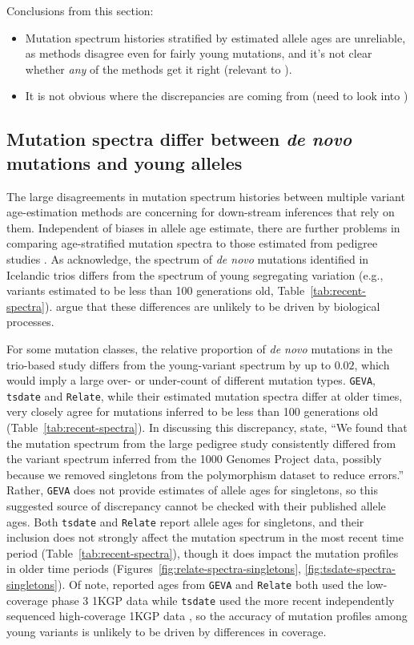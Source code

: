 \documentclass[]{article}
\newcommand{\GEVA}{\texttt{GEVA}\xspace}
\newcommand{\tsdate}{\texttt{tsdate}\xspace}
\newcommand{\relate}{\texttt{Relate}\xspace}
\begin{document}
Conclusions from this section:
\begin{itemize}
    \item Mutation spectrum histories stratified by estimated allele ages are
        unreliable, as methods disagree even for fairly young mutations,
        and it's not clear whether \emph{any} of the methods get
        it right (relevant to \citet{gao2022limited}).
    \item It is not obvious where the discrepancies are coming from (need
        to look into \citet{brandt2022evaluation})
\end{itemize}

\subsection*{Mutation spectra differ between \emph{de novo} mutations and young
alleles}

The large disagreements in mutation spectrum histories between multiple variant
age-estimation methods are concerning for down-stream inferences that rely on
them. Independent of biases in allele age estimate, there are further problems
in comparing age-stratified mutation spectra to those estimated from pedigree
studies \citep{jonsson2017parental,halldorsson2019characterizing}. As
\citet{wang2023human} acknowledge, the spectrum of \emph{de novo} mutations
identified in Icelandic trios \citep{jonsson2017parental} differs from the
spectrum of young segregating variation (e.g., variants estimated to be less
than 100 generations old, Table~\ref{tab:recent-spectra}).
\citet{gao2022limited} argue that these differences are unlikely to be driven
by biological processes.

For some mutation classes, the relative proportion of \emph{de novo} mutations
in the trio-based study differs from the young-variant spectrum by up to
$0.02$, which would imply a large over- or under-count of different mutation
types. \GEVA, \tsdate and \relate, while their estimated mutation spectra
differ at older times, very closely agree for mutations inferred to be less
than 100 generations old (Table~\ref{tab:recent-spectra}). In discussing this
discrepancy, \citet{wang2023human} state, ``We found that the mutation spectrum
from the large pedigree study consistently differed from the variant spectrum
inferred from the 1000 Genomes Project data, possibly because we removed
singletons from the polymorphism dataset to reduce errors.'' Rather, \GEVA does
not provide estimates of allele ages for singletons, so this suggested source
of discrepancy cannot be checked with their published allele ages. Both \tsdate
and \relate report allele ages for singletons, and their inclusion does not
strongly affect the mutation spectrum in the most recent time period
(Table~\ref{tab:recent-spectra}), though it does impact the mutation profiles
in older time periods (Figures~\ref{fig:relate-spectra-singletons},
\ref{fig:tsdate-spectra-singletons}). Of note, reported ages from \GEVA and
\relate both used the low-coverage phase 3 1KGP data while \tsdate used the
more recent independently sequenced high-coverage 1KGP data
\citep{byrska2022high}, so the accuracy of mutation profiles among young
variants is unlikely to be driven by differences in coverage.
\end{document}
